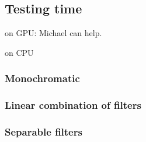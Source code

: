 \documentclass{article}
\begin{document}
\subsection{Testing time}

on GPU: Michael can help.

on CPU

\subsubsection{Monochromatic}

\subsubsection{Linear combination of filters}

\subsubsection{Separable filters}
\end{document}
